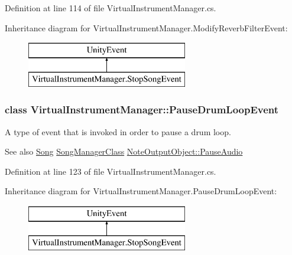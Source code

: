 Definition at line 114 of file Virtual\+Instrument\+Manager.\+cs.

Inheritance diagram for Virtual\+Instrument\+Manager.\+Modify\+Reverb\+Filter\+Event\+:\begin{figure}[H]
\begin{center}
\leavevmode
\includegraphics[height=2.000000cm]{group___v_i_m_event_types}
\end{center}
\end{figure}
\label{class_virtual_instrument_manager_1_1_pause_drum_loop_event}
\subsubsection{class Virtual\+Instrument\+Manager\+:\+:Pause\+Drum\+Loop\+Event}
A type of event that is invoked in order to pause a drum loop. 

\begin{DoxySeeAlso}{See also}
\hyperlink{class_song}{Song} \hyperlink{class_song_manager_class}{Song\+Manager\+Class} \hyperlink{group___n_o_o_pub_func_ga7977bc941f355866c7e4c141a8f7b8bb}{Note\+Output\+Object\+::\+Pause\+Audio} 
\end{DoxySeeAlso}


Definition at line 123 of file Virtual\+Instrument\+Manager.\+cs.

Inheritance diagram for Virtual\+Instrument\+Manager.\+Pause\+Drum\+Loop\+Event\+:\begin{figure}[H]
\begin{center}
\leavevmode
\includegraphics[height=2.000000cm]{group___v_i_m_event_types}
\end{center}
\end{figure}
\label{class_virtual_instrument_manager_1_1_pause_song_event}
